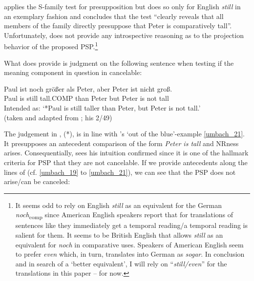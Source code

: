 \documentclass[output=paper
,modfonts
,nonflat]{langsci/langscibook}
\begin{document}
\citeauthor{Hofstetter2013} applies the S-family test \citep{kadmon2001} for presupposition but does so only for English \textit{still} in an exemplary fashion and concludes that the test ``clearly reveals that all members of the family directly presuppose that Peter is comparatively tall''. Unfortunately, \citeauthor{Hofstetter2013} does not provide any introspective reasoning as to the projection behavior of the proposed PSP.\footnote{ It seems odd to rely on English \textit{still} as an equivalent for the German \textit{noch}\textsubscript{comp} since American English speakers report that for translations of sentences like  they immediately get a temporal reading/a temporal reading is salient for them. It seems to be British English that allows \textit{still} as an equivalent for \textit{noch} in comparative uses. Speakers of American English seem to prefer \textit{even} which, in turn, translates into German as \textit{sogar}. In conclusion and in search of a `better equivalent', I will rely on ``\textit{still\slash even}'' for the translations in this paper -- for now.}

What \citeauthor{Hofstetter2013} does provide is judgment on the following sentence when testing if the meaning component in question in cancelable:

\ea\gll *Paul ist noch größer als Peter, aber Peter ist nicht groß.\\
       Paul is still tall.COMP than Peter but Peter is not tall\\
\glt   Intended as: {`*Paul is still taller than Peter, but Peter is not tall.'} \\ (taken and adapted from \citeyearpar[27]{Hofstetter2013}; his 2/49) \label{hofstetter_ABER_peter_nicht_gross}
\z

\noindent The judgement in , (*), is in line with \citeauthor{umbach2009a_comp}'s \citeyearpar{umbach2009a_comp} `out of the blue'-example \ref{umbach_21}. It presupposes an antecedent comparison of the form \textit{Peter is tall} and NRness arises. Consequentially, \citet{Hofstetter2013} sees his intuition \linebreak confirmed since it is one of the hallmark criteria for PSP that they are not cancelable. If we provide antecedents along the lines of \citeauthor{umbach2009a_comp} (cf. \ref{umbach_19} to \ref{umbach_21}), we can see that the PSP does not arise/can be canceled: 
\end{document}
